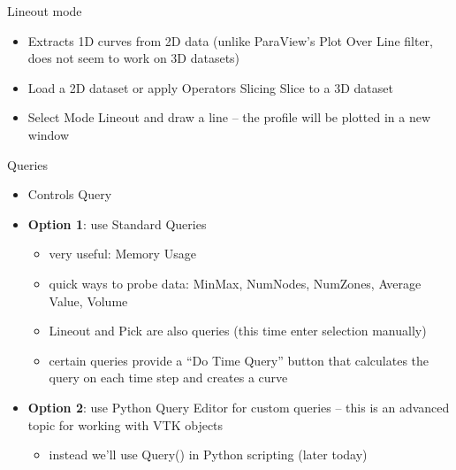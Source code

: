 \begin{frame}{Lineout mode}
  \begin{itemize}\setlength{\itemsep}{2mm}
  \item Extracts 1D curves from 2D data (unlike ParaView's Plot Over Line filter, does not seem to work
    on 3D datasets)
  \item Load a 2D dataset or apply Operators \ra Slicing \ra Slice to a 3D dataset
  \item Select Mode \ra Lineout and draw a line -- the profile will be plotted in a new window
  \end{itemize}
\end{frame}

\begin{frame}{Queries}
  \begin{itemize}\setlength{\itemsep}{3mm}
  \item Controls \ra Query
  \item {\bf Option 1}: use Standard Queries
    \begin{itemize}\setlength{\itemsep}{0mm}
    \item very useful: Memory Usage
    \item quick ways to probe data: MinMax, NumNodes, NumZones, Average Value, Volume
    \item Lineout and Pick are also queries (this time enter selection manually)
    \item certain queries provide a ``Do Time Query'' button that calculates the query on each time step
      and creates a curve
    \end{itemize}
  \item {\bf Option 2}: use Python Query Editor for custom queries -- this is an advanced topic for
    working with VTK objects
    \begin{itemize}\setlength{\itemsep}{0mm}
    \item instead we'll use Query() in Python scripting (later today)
    \end{itemize}
  \end{itemize}
\end{frame}

